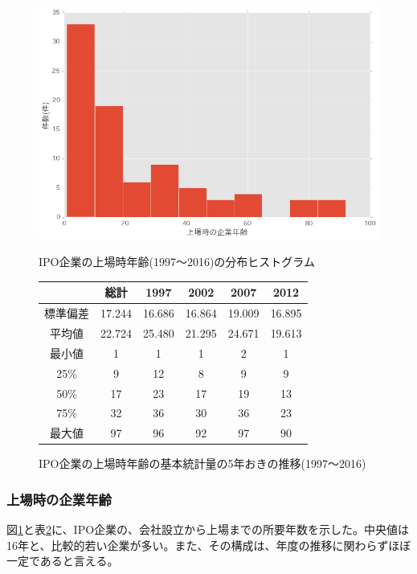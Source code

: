 \documentclass{jsarticle}
\begin{document}
\newpage

\begin{figure}[!h]
  \begin{center}
  \caption{IPO企業の上場時年齢(1997〜2016)の分布ヒストグラム}
    \includegraphics[clip,width=14cm]{./age.png}
    \label{agehist}
  \end{center}
\end{figure}

\begin{figure}[!h]
  \begin{center}
  \caption{IPO企業の上場時年齢の基本統計量の5年おきの推移(1997〜2016)}
\begin{tabular}{cccccc}
\hline
\  & 総計 & 1997 & 2002 & 2007 & 2012  \\
 \hline \hline
標準偏差 & 17.244 & 16.686 & 16.864 & 19.009 & 16.895   \\
\hline
平均値 & 22.724 & 25.480 & 21.295 & 24.671 & 19.613   \\
\hline
最小値 & 1 & 1 & 1 & 2 & 1   \\
25\% & 9 & 12 & 8 & 9 & 9   \\
50\% & 17 & 23 & 17 & 19 & 13   \\
75\% & 32 & 36 & 30 & 36 & 23   \\
最大値 & 97 & 96 & 92 & 97 & 90   \\
\hline
	\end{tabular}
	\label{age} 
  \end{center}
\end{figure}

\newpage

\subsubsection{上場時の企業年齢}
図\ref{agehist}と表\ref{age}に、IPO企業の、会社設立から上場までの所要年数を示した。中央値は16年と、比較的若い企業が多い。また、その構成は、年度の推移に関わらずほぼ一定であると言える。
\end{document}
